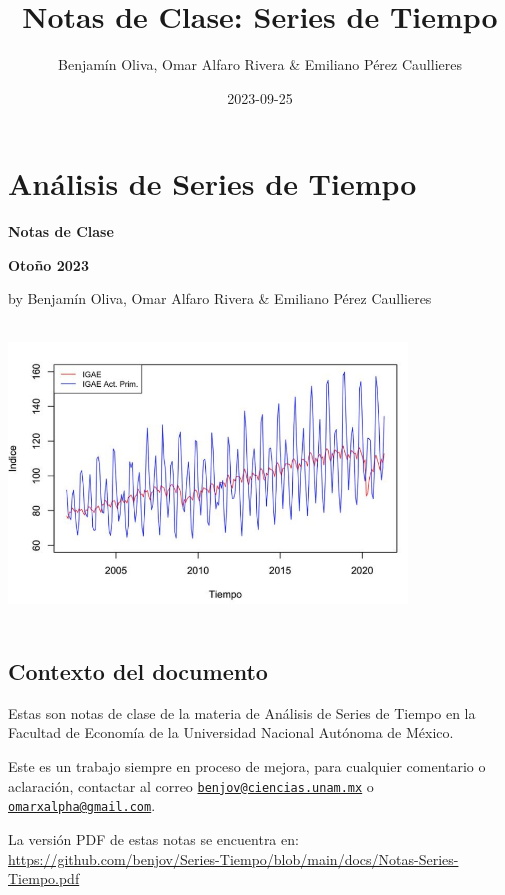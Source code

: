 \documentclass[
]{book}
\title{Notas de Clase: Series de Tiempo}
\author{Benjamín Oliva, Omar Alfaro Rivera \& Emiliano Pérez Caullieres}
\date{2023-09-25}
\begin{document}
\maketitle

{
\setcounter{tocdepth}{1}
\tableofcontents
}
\hypertarget{anuxe1lisis-de-series-de-tiempo}{%
\chapter*{Análisis de Series de Tiempo}\label{anuxe1lisis-de-series-de-tiempo}}

\textbf{Notas de Clase}

\textbf{Otoño 2023}

by Benjamín Oliva, Omar Alfaro Rivera \& Emiliano Pérez Caullieres

\includegraphics[width=4.16667in,height=3.125in]{Portada.png}

\hypertarget{contexto-del-documento}{%
\section*{Contexto del documento}\label{contexto-del-documento}}

Estas son notas de clase de la materia de Análisis de Series de Tiempo en la Facultad de Economía de la Universidad Nacional Autónoma de México.

Este es un trabajo siempre en proceso de mejora, para cualquier comentario o aclaración, contactar al correo \href{mailto:benjov@ciencias.unam.mx}{\nolinkurl{benjov@ciencias.unam.mx}} o \href{mailto:omarxalpha@gmail.com}{\nolinkurl{omarxalpha@gmail.com}}.

La versión PDF de estas notas se encuentra en: \url{https://github.com/benjov/Series-Tiempo/blob/main/docs/Notas-Series-Tiempo.pdf}
\end{document}
